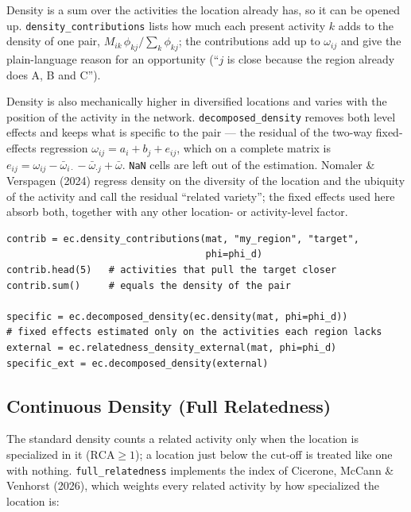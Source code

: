 \documentclass[12pt, a4paper]{article}
\newcommand{\fn}[1]{\texttt{#1}}
\begin{document}
\begin{sloppypar}
Density is a sum over the activities the location already has, so it can
be opened up. \fn{density\_contributions} lists how much each present
activity $k$ adds to the density of one pair,
$M_{ik}\,\phi_{kj} / \sum_k \phi_{kj}$; the contributions add up to
$\omega_{ij}$ and give the plain-language reason for an opportunity
(``$j$ is close because the region already does A, B and C'').
\end{sloppypar}

Density is also mechanically higher in diversified locations and varies
with the position of the activity in the network.
\fn{decomposed\_density} removes both level effects and keeps what is
specific to the pair --- the residual of the two-way fixed-effects
regression $\omega_{ij} = a_i + b_j + e_{ij}$, which on a complete matrix
is $e_{ij} = \omega_{ij} - \bar\omega_{i\cdot} - \bar\omega_{\cdot j} +
\bar\omega$. \texttt{NaN} cells are left out of the estimation. Nomaler
\& Verspagen (2024) regress density on the diversity of the location and
the ubiquity of the activity and call the residual ``related variety'';
the fixed effects used here absorb both, together with any other
location- or activity-level factor.

\begin{lstlisting}[caption={Contributions to density and density net of fixed effects}]
contrib = ec.density_contributions(mat, "my_region", "target",
                                   phi=phi_d)
contrib.head(5)   # activities that pull the target closer
contrib.sum()     # equals the density of the pair

specific = ec.decomposed_density(ec.density(mat, phi=phi_d))
# fixed effects estimated only on the activities each region lacks
external = ec.relatedness_density_external(mat, phi=phi_d)
specific_ext = ec.decomposed_density(external)
\end{lstlisting}

\subsection{Continuous Density (Full Relatedness)}

\begin{sloppypar}
The standard density counts a related activity only when the location is
specialized in it ($\text{RCA} \geq 1$); a location just below the
cut-off is treated like one with nothing. \fn{full\_relatedness}
implements the index of Cicerone, McCann \& Venhorst (2026), which
weights every related activity by how specialized the location is:
\end{sloppypar}
\end{document}
